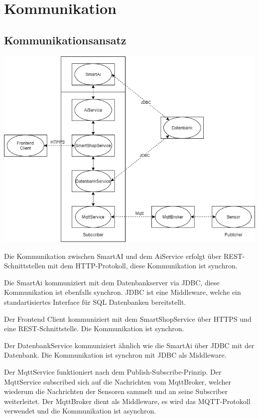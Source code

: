 \documentclass[runningheads]{llncs}
\begin{document}
\section{Kommunikation}

\subsection{Kommunikationsansatz}
\includegraphics[width=\linewidth]{images/Kommunikation}

Die Kommunikation zwischen SmartAI und dem AiService erfolgt über REST-Schnittstellen mit dem HTTP-Protokoll, diese Kommunikation ist synchron.

Die SmartAi kommuniziert mit dem Datenbankserver via JDBC, diese Kommunikation ist ebenfalls synchron. JDBC ist eine Middleware, welche ein standartisiertes Interface für SQL Datenbanken bereitstellt.

Der Frontend Client kommuniziert mit dem SmartShopService über HTTPS und eine REST-Schnittstelle. Die Kommunikation ist synchron.

Der DatenbankService kommuniziert ähnlich wie die SmartAi über JDBC mit der Datenbank. Die Kommunikation ist synchron mit JDBC als Middleware.

Der MqttService funktioniert nach dem Publish-Subscribe-Prinzip. Der MqttService subscribed sich auf die Nachrichten vom MqttBroker, welcher wiederum die Nachrichten der Sensoren sammelt und an seine Subscriber weiterleitet.
Der MqttBroker dient als Middleware, es wird das MQTT-Protokoll verwendet und die Kommunikation ist asynchron. \\
\end{document}
